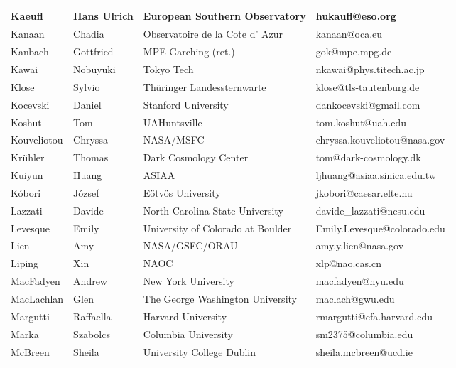 \begin{center}
\begin{longtable}{|p{1.6cm} |p{1.6cm} |p{2cm} |p{3cm} |}
\tiny Kaeufl &\tiny Hans Ulrich & \tiny European Southern Observatory & \tiny hukaufl@eso.org \\ \hline
\tiny Kanaan &\tiny Chadia & \tiny Observatoire de la Cote d' Azur & \tiny kanaan@oca.eu \\ \hline
\tiny Kanbach &\tiny Gottfried & \tiny MPE Garching (ret.) & \tiny gok@mpe.mpg.de \\ \hline
\tiny Kawai &\tiny Nobuyuki & \tiny Tokyo Tech & \tiny nkawai@phys.titech.ac.jp \\ \hline
\tiny Klose &\tiny Sylvio & \tiny Th\"uringer Landessternwarte & \tiny klose@tls-tautenburg.de \\ \hline
\tiny Kocevski &\tiny Daniel & \tiny Stanford University & \tiny dankocevski@gmail.com \\ \hline
\tiny Koshut &\tiny Tom & \tiny UAHuntsville & \tiny tom.koshut@uah.edu \\ \hline
\tiny Kouveliotou &\tiny Chryssa & \tiny NASA/MSFC & \tiny chryssa.kouveliotou@nasa.gov \\ \hline
\tiny Kr\"uhler &\tiny Thomas & \tiny Dark Cosmology Center & \tiny tom@dark-cosmology.dk \\ \hline
\tiny Kuiyun &\tiny Huang & \tiny ASIAA & \tiny ljhuang@asiaa.sinica.edu.tw \\ \hline
\tiny K\'obori &\tiny J\'ozsef & \tiny E\"otv\"os University & \tiny jkobori@caesar.elte.hu \\ \hline
\tiny Lazzati &\tiny Davide & \tiny North Carolina State University & \tiny davide\_lazzati@ncsu.edu \\ \hline
\tiny Levesque &\tiny Emily & \tiny University of Colorado at Boulder & \tiny Emily.Levesque@colorado.edu \\ \hline
\tiny Lien &\tiny Amy & \tiny NASA/GSFC/ORAU & \tiny amy.y.lien@nasa.gov \\ \hline
\tiny Liping &\tiny Xin & \tiny NAOC & \tiny xlp@nao.cas.cn \\ \hline
\tiny MacFadyen &\tiny Andrew & \tiny New York University & \tiny macfadyen@nyu.edu \\ \hline
\tiny MacLachlan &\tiny Glen & \tiny The George Washington University & \tiny maclach@gwu.edu \\ \hline
\tiny Margutti &\tiny Raffaella & \tiny Harvard University & \tiny rmargutti@cfa.harvard.edu \\ \hline
\tiny Marka &\tiny Szabolcs & \tiny Columbia University & \tiny sm2375@columbia.edu \\ \hline
\tiny McBreen &\tiny Sheila & \tiny University College Dublin & \tiny sheila.mcbreen@ucd.ie \\ \hline

\end{longtable}
\end{center}
